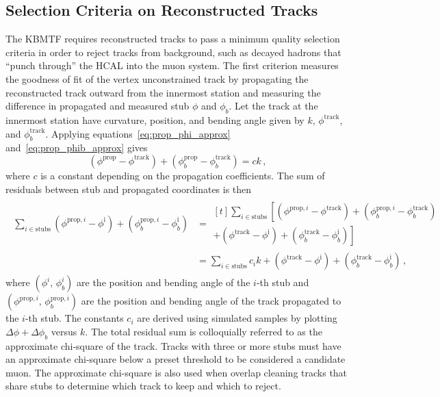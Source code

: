 \subsection{Selection Criteria on Reconstructed Tracks} \label{sec:kmtf_qual}
The KBMTF requires reconstructed tracks to pass a minimum quality selection criteria in order to reject tracks from background, such as decayed hadrons that ``punch through'' the HCAL into the muon system. The first criterion measures the goodness of fit of the vertex unconstrained track by propagating the reconstructed track outward from the innermost station and measuring the difference in propagated and measured stub $\phi$ and $\phi_b$. Let the track at the innermost station have curvature, position, and bending angle given by $k$, $\phi^\text{track}$, and $\phi_b^\text{track}$. Applying equations~\ref{eq:prop_phi_approx} and~\ref{eq:prop_phib_approx} gives
\begin{equation}
	\label{eq:residual_prop}
	\left(\phi^\text{prop}-\phi^\text{track}\right)+\left(\phi_b^\text{prop}-\phi_b^\text{track}\right)=ck\,,
\end{equation}
where $c$ is a constant depending on the propagation coefficients. The sum of residuals between stub and propagated coordinates is then 
\begin{align}
	\begin{split}
	\sum_{i\in\text{stubs}}\left(\phi^{\text{prop},i}-\phi^\text{i}\right)+\left(\phi_b^{\text{prop},i}-\phi_b^\text{i}\right)	&=\begin{multlined}[t]
									\sum_{i\in\text{stubs}}\left[(\phi^{\text{prop},i}-\phi^\text{track})+(\phi_b^{\text{prop},i}-\phi_b^\text{track})\right.\\
									+\left.(\phi^\text{track}-\phi^\text{i})+(\phi_b^\text{track}-\phi_b^\text{i})\right]
								\end{multlined}\\
 								& =\sum_{i\in\text{stubs}}c_ik+\left(\phi^\text{track}-\phi^\text{i}\right)+\left(\phi_b^\text{track}-\phi_b^\text{i}\right)\,,
 	\end{split}
\end{align}
where $(\phi^i,\,\phi_b^i)$ are the position and bending angle of the $i$-th stub and $(\phi^{\text{prop},i},\,\phi_b^{\text{prop},i})$ are the position and bending angle of the track propagated to the $i$-th stub. The constants $c_i$ are derived using simulated samples by plotting $\Delta\phi+\Delta\phi_b$ versus $k$. The total residual sum is colloquially referred to as the approximate chi-square of the track. Tracks with three or more stubs must have an approximate chi-square below a preset threshold to be considered a candidate muon. The approximate chi-square is also used when overlap cleaning tracks that share stubs to determine which track to keep and which to reject.

